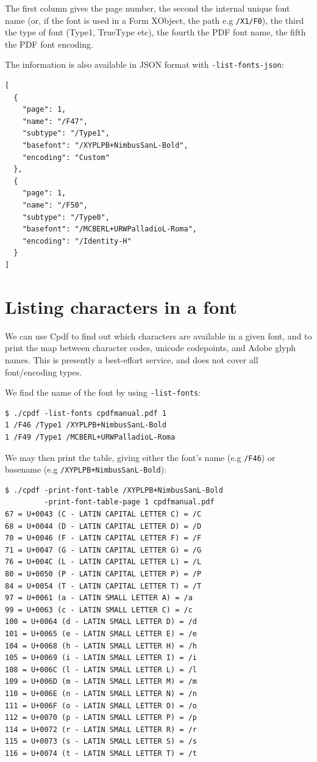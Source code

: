\documentclass{book}
\begin{document}
\noindent The first column gives the page number, the second the internal unique font
name (or, if the font is used in a Form XObject, the path e.g \texttt{/X1/F0}), the third the type of font (Type1, TrueType etc), the fourth the PDF font
name, the fifth the PDF font encoding.

The information is also available in JSON format with \texttt{-list-fonts-json}:

{\small\begin{framed}\small\begin{verbatim}
[
  {
    "page": 1,
    "name": "/F47",
    "subtype": "/Type1",
    "basefont": "/XYPLPB+NimbusSanL-Bold",
    "encoding": "Custom"
  },
  {
    "page": 1,
    "name": "/F50",
    "subtype": "/Type0",
    "basefont": "/MCBERL+URWPalladioL-Roma",
    "encoding": "/Identity-H"
  }
]
\end{verbatim}
\end{framed}}


\section{Listing characters in a font}
We can use Cpdf to find out which characters are available in a given font, and to print the map between character codes, unicode codepoints, and Adobe glyph names. This is presently a best-effort service, and does not cover all font/encoding types.

We find the name of the font by using \texttt{-list-fonts}:

{\small\begin{verbatim}
$ ./cpdf -list-fonts cpdfmanual.pdf 1
1 /F46 /Type1 /XYPLPB+NimbusSanL-Bold 
1 /F49 /Type1 /MCBERL+URWPalladioL-Roma 
\end{verbatim}}

\noindent We may then print the table, giving either the font's name (e.g \texttt{/F46}) or basename (e.g \texttt{/XYPLPB+NimbusSanL-Bold}):

{\small\begin{verbatim}
$ ./cpdf -print-font-table /XYPLPB+NimbusSanL-Bold
         -print-font-table-page 1 cpdfmanual.pdf
67 = U+0043 (C - LATIN CAPITAL LETTER C) = /C
68 = U+0044 (D - LATIN CAPITAL LETTER D) = /D
70 = U+0046 (F - LATIN CAPITAL LETTER F) = /F
71 = U+0047 (G - LATIN CAPITAL LETTER G) = /G
76 = U+004C (L - LATIN CAPITAL LETTER L) = /L
80 = U+0050 (P - LATIN CAPITAL LETTER P) = /P
84 = U+0054 (T - LATIN CAPITAL LETTER T) = /T
97 = U+0061 (a - LATIN SMALL LETTER A) = /a
99 = U+0063 (c - LATIN SMALL LETTER C) = /c
100 = U+0064 (d - LATIN SMALL LETTER D) = /d
101 = U+0065 (e - LATIN SMALL LETTER E) = /e
104 = U+0068 (h - LATIN SMALL LETTER H) = /h
105 = U+0069 (i - LATIN SMALL LETTER I) = /i
108 = U+006C (l - LATIN SMALL LETTER L) = /l
109 = U+006D (m - LATIN SMALL LETTER M) = /m
110 = U+006E (n - LATIN SMALL LETTER N) = /n
111 = U+006F (o - LATIN SMALL LETTER O) = /o
112 = U+0070 (p - LATIN SMALL LETTER P) = /p
114 = U+0072 (r - LATIN SMALL LETTER R) = /r
115 = U+0073 (s - LATIN SMALL LETTER S) = /s
116 = U+0074 (t - LATIN SMALL LETTER T) = /t
\end{verbatim}}
\end{document}
